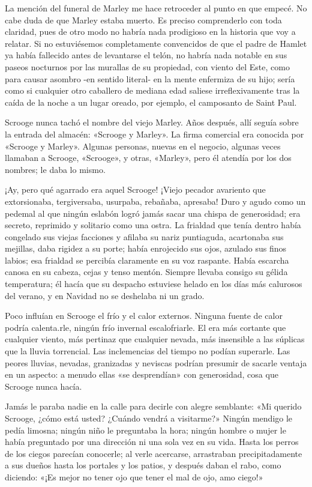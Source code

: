 \documentclass{novela}
\begin{document}
 La mención del funeral de Marley me hace retroceder al punto en que empecé. No cabe duda de que Marley estaba muerto. Es preciso comprenderlo con toda claridad, pues de otro modo no habría nada prodigioso en la historia que voy a relatar. Si no estuviésemos completamente convencidos de que el padre de Hamlet ya había fallecido antes de levantarse el telón, no habría nada notable en sus paseos nocturnos por las murallas de su propiedad, con viento del Este, como para causar asombro -en sentido literal- en la mente enfermiza de su hijo; sería como si cualquier otro caballero de mediana edad saliese irreflexivamente tras la caída de la noche a un lugar oreado, por ejemplo, el camposanto de Saint Paul.

 Scrooge nunca tachó el nombre del viejo Marley. Años después, allí seguía sobre la entrada del almacén: «Scrooge y Marley». La firma comercial era conocida por «Scrooge y Marley».  Algunas personas, nuevas en el negocio, algunas veces llamaban a Scrooge, «Scrooge», y otras, «Marley», pero él atendía por los dos nombres; le daba lo mismo.

 ¡Ay, pero qué agarrado era aquel Scrooge! ¡Viejo pecador avariento que extorsionaba, tergiversaba, usurpaba, rebañaba, apresaba! Duro y agudo como un pedemal al que ningún eslabón logró jamás sacar una chispa de generosidad; era secreto, reprimido y solitario como una ostra. La frialdad que tenía dentro había congelado sus viejas facciones y afilaba su nariz puntiaguda, acartonaba sus mejillas, daba rigidez a su porte; había enrojecido sus ojos, azulado sus finos labios; esa frialdad se percibía claramente en su voz raspante. Había escarcha canosa en su cabeza, cejas y tenso mentón. Siempre llevaba consigo su gélida temperatura; él hacía que su despacho estuviese helado en los días más calurosos del verano, y en Navidad no se deshelaba ni un grado.

 Poco influían en Scrooge el frío y el calor externos. Ninguna fuente de calor podría calenta.rle, ningún frío invernal escalofriarle. El era más cortante que cualquier viento, más pertinaz que cualquier nevada, más insensible a las súplicas que la lluvia torrencial. Las inclemencias del tiempo no podían superarle. Las peores lluvias, nevadas, granizadas y neviscas podrían presumir de sacarle ventaja en un aspecto: a menudo ellas «se desprendían» con generosidad, cosa que Scrooge nunca hacía.

 Jamás le paraba nadie en la calle para decirle con alegre semblante: «Mi querido Scrooge, ¿cómo está usted? ¿Cuándo vendrá a visitarme?» Ningún mendigo le pedía limosna; ningún niño le preguntaba la hora; ningún hombre o mujer le había preguntado por una dirección ni una sola vez en su vida. Hasta los perros de los ciegos parecían conocerle; al verle acercarse, arrastraban precipitadamente a sus dueños hasta los portales y los patios, y después daban el rabo, como diciendo: «¡Es mejor no tener ojo que tener el mal de ojo, amo ciego!»
\end{document}

